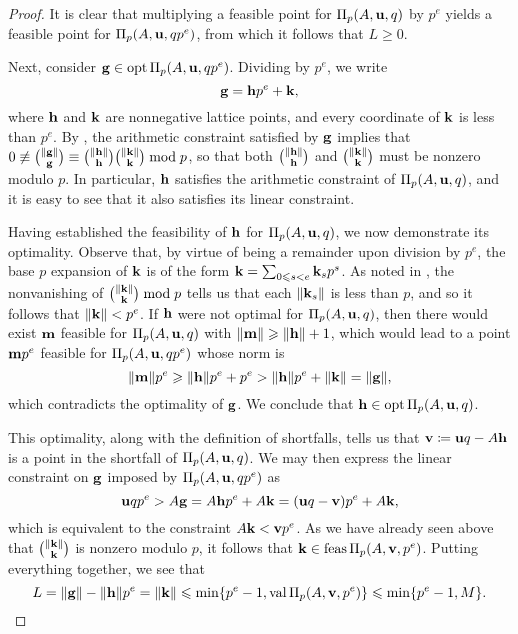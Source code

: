 \documentclass[11pt]{amsart}
\begin{document}
\begin{proof}
   It is clear that multiplying a feasible point for $\Pi_p(A, \mathbf{u}, q)$ by $p^e$ yields a feasible point for $\Pi_p(A, \mathbf{u}, qp^e)$, from which it follows that $L\geq 0$.


   Next, consider $\mathbf{g} \in \operatorname{opt} \Pi_p(A, \mathbf{u}, qp^e)$.
   Dividing by $p^e$, we write
   \[ \mathbf{g} = \mathbf{h} p^e + \mathbf{k}, \]
   where $\mathbf{h}$ and $\mathbf{k}$ are nonnegative lattice points, and every coordinate of $\mathbf{k}$ is less than $p^e$.
   By , the arithmetic constraint satisfied by $\mathbf{g}$ implies that $0 \not \equiv \binom{\| \mathbf{g} \|}{\mathbf{g}} \equiv \binom{\| \mathbf{h} \|}{\mathbf{h}} \binom{\| \mathbf{k} \|}{\mathbf{k}} \bmod p$, so that both $\binom{\| \mathbf{h} \|}{\mathbf{h}}$ and $\binom{\| \mathbf{k} \|}{\mathbf{k}}$ must be nonzero modulo $p$.
   In particular, $\mathbf{h}$ satisfies the arithmetic constraint of $\Pi_p(A,\mathbf{u},q)$, and it is easy to see that it also satisfies its linear constraint.

   Having established the feasibility of $\mathbf{h}$ for $\Pi_p(A,\mathbf{u},q)$, we now demonstrate its optimality.
   Observe that, by virtue of being a remainder upon division by $p^e$, the base $p$ expansion of $\mathbf{k}$ is of the form $\mathbf{k} = \sum_{0 \leqslant s< e} \mathbf{k}_s  p^s$.
   As noted in , the nonvanishing of $\binom{\| \mathbf{k} \|}{\mathbf{k}} \bmod p$ tells us that each $\| \mathbf{k}_s \|$ is less than $p$, and so it follows that $\| \mathbf{k} \| < p^e$.
   If $\mathbf{h}$ were not optimal for $\Pi_p(A, \mathbf{u}, q)$, then there would exist $\mathbf{m}$ feasible for $\Pi_p(A, \mathbf{u}, q)$ with $\| \mathbf{m} \| \geqslant \| \mathbf{h} \| + 1$, which would lead to a point $\mathbf{m}p^e$ feasible for $\Pi_p(A, \mathbf{u}, qp^e)$ whose norm is
   \[ \| \mathbf{m} \|  p^e \geqslant \| \mathbf{h} \|  p^e + p^e >  \| \mathbf{h} \|  p^e + \| \mathbf{k} \| = \| \mathbf{g} \|,\]
   which contradicts the optimality of $\mathbf{g}$.
   We conclude that $\mathbf{h} \in \operatorname{opt} \Pi_p(A, \mathbf{u},q)$.

   This optimality, along with the definition of shortfalls, tells us that $\mathbf{v} \coloneqq \mathbf{u}q-A\mathbf{h}$ is a point in the shortfall of $\Pi_p(A, \mathbf{u},q)$.
   We may then express the linear constraint on $\mathbf{g}$ imposed by $\Pi_p(A, \mathbf{u}, qp^e)$ as
   \[ \mathbf{u}qp^e > A \mathbf{g} = A \mathbf{h} p^e + A \mathbf{k} = (\mathbf{u}q-\mathbf{v})p^e + A \mathbf{k}, \]
   which is equivalent to the constraint $A \mathbf{k} < \mathbf{v}p^e$.
   As we have already seen above that $\binom{\| \mathbf{k} \|}{\mathbf{k}}$ is nonzero modulo $p$, it follows that $\mathbf{k} \in \operatorname{feas} \Pi_p(A, \mathbf{v}, p^e)$.
   Putting everything together, we see that
   \[ L = \| \mathbf{g} \|-\| \mathbf{h} \|p^e = \| \mathbf{k} \| \leqslant \min \{ p^e-1, \operatorname{val} \Pi_p(A, \mathbf{v}, p^e) \} \leqslant \min \{ p^e-1, M \}.\]


\end{proof}
\end{document}
